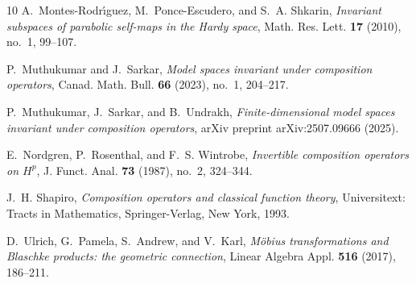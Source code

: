 \documentclass[12pt, reqno]{amsart}
\theoremstyle{definition}
\numberwithin{equation}{section}
\begin{document}
\begin{thebibliography}{10}
	A.~Montes-Rodr\'{\i}guez, M.~Ponce-Escudero, and S.~A. Shkarin, \emph{Invariant
		subspaces of parabolic self-maps in the {H}ardy space}, Math. Res. Lett.
	\textbf{17} (2010), no.~1, 99--107. 
	
	P.~Muthukumar and J.~Sarkar, \emph{Model spaces invariant under composition
		operators}, Canad. Math. Bull. \textbf{66} (2023), no.~1, 204--217.
	
	P.~Muthukumar, J.~Sarkar, and B.~Undrakh, \emph{Finite-dimensional model spaces
		invariant under composition operators}, arXiv preprint arXiv:2507.09666
	(2025).
	
	E.~Nordgren, P.~Rosenthal, and F.~S. Wintrobe, \emph{Invertible composition
		operators on {$H^p$}}, J. Funct. Anal. \textbf{73} (1987), no.~2, 324--344.
	
	J.~H. Shapiro, \emph{Composition operators and classical function theory},
	Universitext: Tracts in Mathematics, Springer-Verlag, New York, 1993.
	
	D.~Ulrich, G.~Pamela, S.~Andrew, and V.~Karl, \emph{M\"{o}bius transformations
		and {B}laschke products: the geometric connection}, Linear Algebra Appl.
	\textbf{516} (2017), 186--211. 
	
\end{thebibliography}


















                                                                 	
\end{document}
